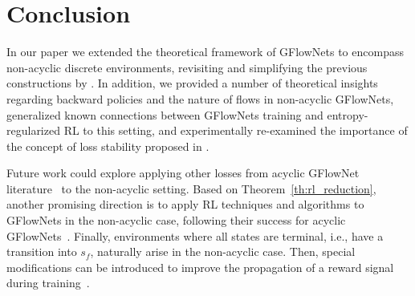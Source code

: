 

\section{Conclusion}
\label{sec:conclusion}

In our paper we extended the theoretical framework of GFlowNets to encompass non-acyclic discrete environments, revisiting and simplifying the previous constructions by \cite{brunswic2024theory}. In addition, we provided a number of theoretical insights regarding backward policies and the nature of flows in non-acyclic GFlowNets, generalized known connections between GFlowNets training and entropy-regularized RL to this setting, and experimentally re-examined the importance of the concept of loss stability proposed in \cite{brunswic2024theory}.


Future work could explore applying other losses from acyclic GFlowNet literature~\cite{madan2023learning, da2024divergence, hu2024beyond} to the non-acyclic setting. Based on Theorem~\ref{th:rl_reduction}, another promising direction is to apply RL techniques and algorithms to GFlowNets in the non-acyclic case, following their success for acyclic GFlowNets~\cite{tiapkin2024generative, mohammadpour2024maximum, lau2024qgfn, morozov2024improving}. Finally, environments where all states are terminal, i.e., have a transition into $s_f$, naturally arise in the non-acyclic case. Then, special modifications can be introduced to improve the propagation of a reward signal during training~\cite{deleu2022bayesian, pan2023better}.


